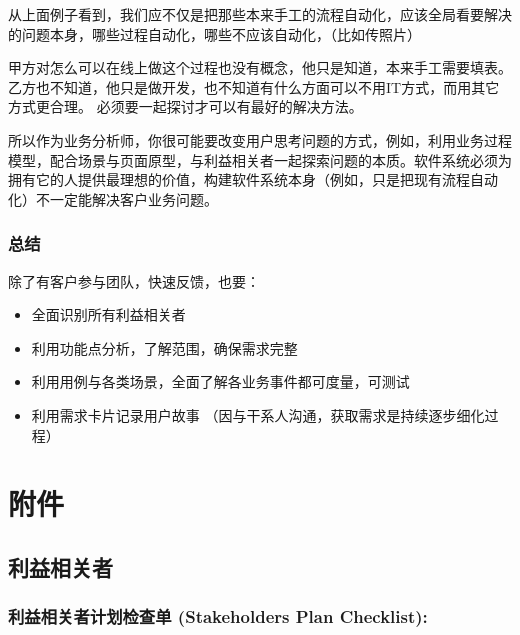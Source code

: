 从上面例子看到，我们应不仅是把那些本来手工的流程自动化，应该全局看要解决的问题本身，哪些过程自动化，哪些不应该自动化，（比如传照片）

甲方对怎么可以在线上做这个过程也没有概念，他只是知道，本来手工需要填表。
乙方也不知道，他只是做开发，也不知道有什么方面可以不用IT方式，而用其它方式更合理。
必须要一起探讨才可以有最好的解决方法。

所以作为业务分析师，你很可能要改变用户思考问题的方式，例如，利用业务过程模型，配合场景与页面原型，与利益相关者一起探索问题的本质。软件系统必须为拥有它的人提供最理想的价值，构建软件系统本身（例如，只是把现有流程自动化）不一定能解决客户业务问题。

\hypertarget{ux603bux7ed3}{%
\subsubsection{总结}\label{ux603bux7ed3}}

除了有客户参与团队，快速反馈，也要：

\begin{itemize}
\tightlist
\item
  全面识别所有利益相关者
\item
  利用功能点分析，了解范围，确保需求完整
\item
  利用用例与各类场景，全面了解各业务事件都可度量，可测试
\item
  利用需求卡片记录用户故事
  （因与干系人沟通，获取需求是持续逐步细化过程）
\end{itemize}

\hypertarget{ux9644ux4ef6}{%
\section{附件}\label{ux9644ux4ef6}}

\hypertarget{ux5229ux76caux76f8ux5173ux8005}{%
\subsection{利益相关者}\label{ux5229ux76caux76f8ux5173ux8005}}

\hypertarget{ux5229ux76caux76f8ux5173ux8005ux8ba1ux5212ux68c0ux67e5ux5355-stakeholders-plan-checklist}{%
\subsubsection{利益相关者计划检查单 (Stakeholders Plan
Checklist):}\label{ux5229ux76caux76f8ux5173ux8005ux8ba1ux5212ux68c0ux67e5ux5355-stakeholders-plan-checklist}}

